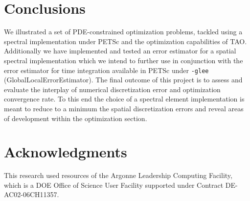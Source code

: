 \documentclass[10pt]{article}
\begin{document}
\section{Conclusions}
\label{sec:conclusion}
We illustrated a set of PDE-constrained optimization problems, tackled using a spectral implementation under PETSc and the optimization capabilities of TAO.  Additionally we have implemented and tested an error estimator for a spatial spectral implementation which we intend to further use in conjunction with the error estimator for time integration available in PETSc under {\texttt{-glee}} (GlobalLocalErrorEstimator). The final outcome of this project is to assess and evaluate the interplay of numerical discretization error and optimization convergence rate. To this end the choice of a spectral element implementation is meant to reduce to a minimum the spatial discretization errors and reveal areas of development within the optimization section.


\section*{Acknowledgments}

This research used resources of the Argonne Leadership Computing Facility, 
which is a DOE Office of Science User Facility supported under Contract 
DE-AC02-06CH11357.


\vskip 10pt
\noindent\scriptsize \framebox{
\parbox{0.96\textwidth}{
The submitted manuscript has been created by the University of Chicago
as Operator of Argonne National Laboratory (``Argonne'') under
Contract No. DE-AC02-06CH11357 with the U.S. Department of Energy.
The U.S. Government retains for itself, and others acting on its
behalf, a paid-up, nonexclusive, irrevocable worldwide license in said
article to reproduce, prepare derivative works, distribute copies to
the public, and perform publicly and display publicly, by or on behalf
of the Government.
}
} \normalsize



\end{document}
